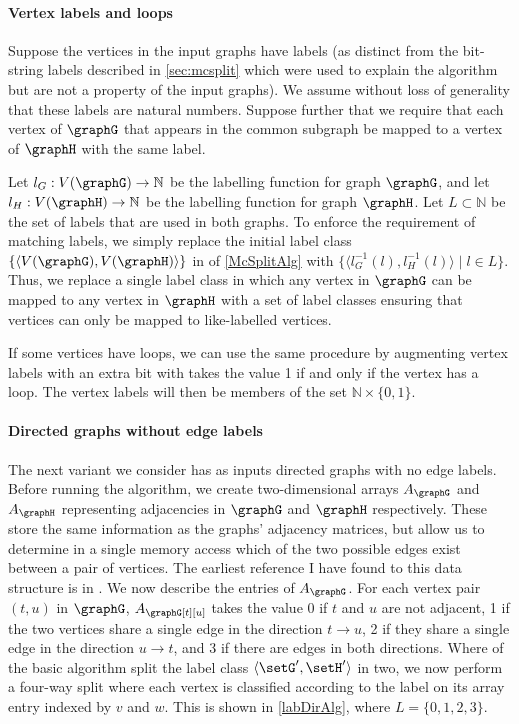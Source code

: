 \paragraph{Vertex labels and loops} Suppose the vertices in the input graphs have labels
(as distinct from the bit-string labels described in \cref{sec:mcsplit} which were used to
explain the algorithm but are not a property of the input graphs). We assume without loss
of generality that these labels are natural numbers. Suppose further that
we require that each vertex of $\graphG$ that appears in the common subgraph be mapped to a vertex
of $\graphH$ with the same label.

Let $l_G: V(\graphG) \rightarrow \mathbb{N}$ be the labelling function for graph $\graphG$,
and let $l_H: V(\graphH) \rightarrow \mathbb{N}$ be the labelling function for graph $\graphH$.
Let $L \subset \mathbb{N}$ be the set of labels that are used in both graphs.
To enforce the requirement of matching labels, we simply
replace the initial label class $\{\langle V(\graphG),V(\graphH) \rangle\}$ in 
of \cref{McSplitAlg}
with $\{\langle l_G^{-1}(l), l_H^{-1}(l)\rangle \mid l \in L\}$.  Thus, we replace
a single label class in which any vertex in $\graphG$ can be mapped to any
vertex in $\graphH$ with a set of label classes ensuring that vertices can only
be mapped to like-labelled vertices.

If some vertices have loops, we can use the same procedure by augmenting vertex labels with an extra
bit with takes the value 1 if and only if the vertex has a loop.  The vertex labels will then
be members of the set $\mathbb{N} \times \{0,1\}$.

\paragraph{Directed graphs without edge labels} The next variant we consider has as inputs directed
graphs with no edge labels.
Before running the algorithm,
we create two-dimensional arrays $A_\graphG$ and $A_\graphH$ representing adjacencies in
$\graphG$ and $\graphH$ respectively.  These store the same information as the graphs'
adjacency matrices, but allow us to determine in a single memory access which of
the two possible edges exist between a pair of vertices.  The earliest reference I have
found to this data structure is in \cite{DBLP:conf/wea/Lopez-PresaA09}.
We now describe the entries of $A_\graphG$.
For each vertex pair $(t,u)$ in $\graphG$,
$A_\graphG[t][u]$ takes the value 0 if $t$ and $u$ are not
adjacent, 1 if the two vertices share a single edge in the direction $t
\rightarrow u$, 2 if they share a single edge in the direction $u \rightarrow
t$, and 3 if there are edges in both directions. Where
 of the basic algorithm split the
label class $\langle \setG',\setH' \rangle$ in two, we now perform a four-way split
where each vertex is classified according to the label on its array entry indexed by
$v$ and $w$.  This is shown in \cref{labDirAlg}, where
$L=\{0,1,2,3\}$.

